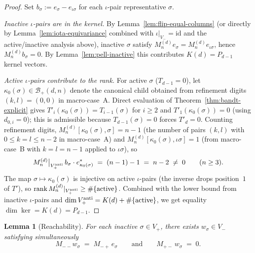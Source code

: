 \documentclass{amsart}
\newtheorem{lemma}[theorem]{Lemma}
\theoremstyle{definition}
\theoremstyle{remark}
\DeclareMathOperator{\rank}{rank}
\begin{document}
\begin{proof}
Set $b_\sigma := e_\sigma - e_{\iota\sigma}$ for each $\iota$-pair
representative $\sigma$.

\textit{Inactive $\iota$-pairs are in the kernel.}  By
Lemma~\ref{lem:flip-equal-columns} (or directly by
Lemma~\ref{lem:iota-equivariance} combined with
$\iota|_{V_-} = \mathrm{id}$ and the active/inactive analysis
above), inactive $\sigma$ satisfy $M_n^{(d)} e_\sigma =
M_n^{(d)} e_{\iota\sigma}$, hence $M_n^{(d)} b_\sigma = 0$.
By Lemma~\ref{lem:pell-inactive} this contributes
$K(d) = P_{d-1}$ kernel vectors.

\textit{Active $\iota$-pairs contribute to the rank.}  For active
$\sigma$ ($T_{d-1} = 0$), let $\kappa_0(\sigma) \in \mathcal{B}_+(d, n)$
denote the canonical child obtained from refinement digits
$(k, l) = (0, 0)$ in macro-case~A.  Direct evaluation of
Theorem~\ref{thm:bandt-explicit} gives
$T'_i(\kappa_0(\sigma)) = T_{i-1}(\sigma)$ for $i \ge 2$ and
$T'_1(\kappa_0(\sigma)) = 0$ (using $d_{0, i} = 0$); this is
admissible because $T_{d-1}(\sigma) = 0$ forces $T'_d = 0$.
Counting refinement digits, $M_n^{(d)}[\kappa_0(\sigma), \sigma] =
n - 1$ (the number of pairs $(k, l)$ with $0 \le k = l \le n-2$
in macro-case~A) and $M_n^{(d)}[\kappa_0(\sigma), \iota\sigma] = 1$
(from macro-case~B with $k = l = n-1$ applied to $\iota\sigma$),
so
\[
  M_n^{(d)}\big|_{V_+^{\rm anti}}\,b_\sigma
  \cdot e_{\kappa_0(\sigma)}^*
  \;=\; (n-1) - 1 \;=\; n - 2 \;\neq\; 0
  \qquad (n \ge 3).
\]
The map $\sigma \mapsto \kappa_0(\sigma)$ is injective on active
$\iota$-pairs (the inverse drops position~$1$ of $T'$), so
$\rank M_n^{(d)}|_{V_+^{\rm anti}} \ge \#\{\text{active}\}$.
Combined with the lower bound from inactive $\iota$-pairs and
$\dim V_+^{\rm anti} = K(d) + \#\{\text{active}\}$, we get
equality $\dim \ker = K(d) = P_{d-1}$.
\end{proof}

\begin{lemma}[Reachability]
\label{lem:reachability}
For each inactive $\sigma \in V_+$, there exists $w_\sigma \in V_-$
satisfying simultaneously
\begin{equation}\label{eq:reach}
  M_{--} w_\sigma \;=\; M_{-+}\, e_\sigma
  \qquad\text{and}\qquad
  M_{+-}\, w_\sigma \;=\; 0.
\end{equation}
\end{lemma}
\end{document}
